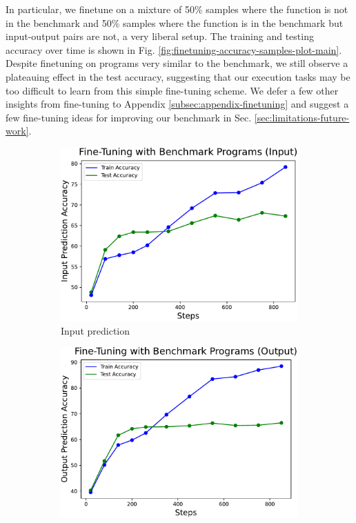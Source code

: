 \documentclass{article}
\begin{document}
In particular, we finetune on a mixture of 50\% samples where the function is not in the benchmark and 50\% samples where the function is in the benchmark but input-output pairs are not, a very liberal setup. The training and testing accuracy over time is shown in Fig. \ref{fig:finetuning-accuracy-samples-plot-main}. Despite finetuning on programs very similar to the benchmark, we still observe a plateauing effect in the test accuracy, suggesting that our execution tasks may be too difficult to learn from this simple fine-tuning scheme. We defer a few other insights from fine-tuning to Appendix \ref{subsec:appendix-finetuning} and suggest a few fine-tuning ideas for improving our benchmark in Sec. \ref{sec:limitations-future-work}.

\begin{figure}[H]
     \centering
     \begin{subfigure}[b]{0.48\textwidth}
         \centering
         \includegraphics[scale=0.4]{figs/finetuning/finetuning_input_moredata_accuracy.pdf}
         \caption{Input prediction}
         \label{fig:finetuning-accuracy-samples-plot-input-main}
     \end{subfigure}
     \hfill
     \begin{subfigure}[b]{0.48\textwidth}
         \centering
         \includegraphics[scale=0.4]{figs/finetuning/finetuning_output_moredata_accuracy.pdf}

\end{subfigure}
\end{figure}
\end{document}
